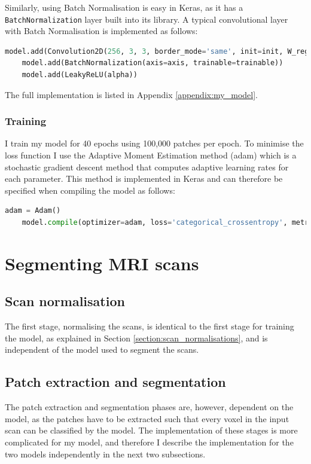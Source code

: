 \documentclass[12pt,a4paper,twoside,openright]{report}
\begin{document}
Similarly, using Batch Normalisation is easy in Keras, as it has a \texttt{BatchNormalization} layer built into its library. A typical convolutional layer with Batch Normalisation is implemented as follows:
\begin{lstlisting}[style=python, language=Python]
	model.add(Convolution2D(256, 3, 3, border_mode='same', init=init, W_regularizer=l2(l)))
	model.add(BatchNormalization(axis=axis, trainable=trainable))
	model.add(LeakyReLU(alpha))
\end{lstlisting}

The full implementation is listed in Appendix \ref{appendix:my_model}.

\subsubsection{Training}
I train my model for 40 epochs using 100,000 patches per epoch. To minimise the loss function I use the Adaptive Moment Estimation method (adam) \cite{adam} which is a stochastic gradient descent method that computes adaptive learning rates for each parameter. This method is implemented in Keras and can therefore be specified when compiling the model as follows:
\begin{lstlisting}[style=python, language=Python]
	adam = Adam()
    model.compile(optimizer=adam, loss='categorical_crossentropy', metrics=['accuracy'])
\end{lstlisting}

\section{Segmenting MRI scans}
\subsection{Scan normalisation}
The first stage, normalising the scans, is identical to the first stage for training the model, as explained in Section \ref{section:scan_normalisations}, and is independent of the model used to segment the scans.

\subsection{Patch extraction and segmentation}
The patch extraction and segmentation phases are, however, dependent on the model, as the patches have to be extracted such that every voxel in the input scan can be classified by the model. The implementation of these stages is more complicated for my model, and therefore I describe the implementation for the two models independently in the next two subsections.
\end{document}

